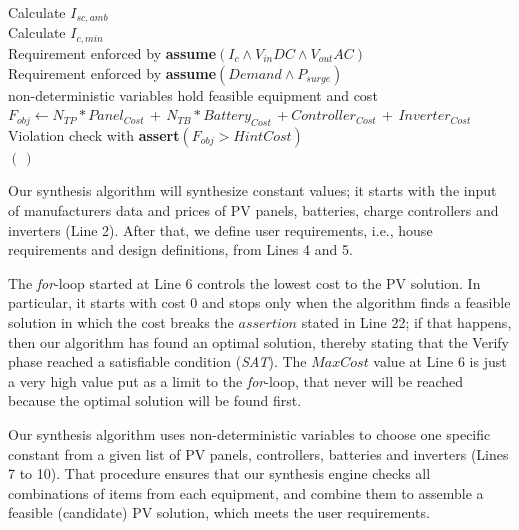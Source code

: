 \documentclass[runningheads]{llncs}
\begin{document}
\begin{algorithm}
\begin{algorithmic}[1]
\begin{scriptsize}
 	\STATE Calculate $I_{sc,amb}$ \\
 	\STATE Calculate $I_{c,min}$ \\
 	\STATE Requirement enforced by \textbf{assume}$(I_{c} \wedge V_{in}DC \wedge V_{out}AC)$ \\
	\STATE Requirement enforced by \textbf{assume}$(Demand \wedge P_{surge})$ \\
	\STATE non-deterministic variables hold feasible equipment and cost  \\
	\STATE $F_{obj} \leftarrow  N_{TP}*Panel_{Cost} \, + \, N_{TB}*Battery_{Cost} \, + Controller_{Cost} \, + \, Inverter_{Cost}$ \\
	\STATE Violation check with \textbf{assert}$(F_{obj} > HintCost)$ \\
  \ENDFOR
 \RETURN $(\,)$ 
  \end{scriptsize}
 \end{algorithmic} 
 \label{alg:verification-algorithm}
 \end{algorithm}
%

Our synthesis algorithm will synthesize constant values; it starts with the input of manufacturers data and prices of PV panels, batteries, charge controllers and inverters (Line 2). After that, we define user requirements, i.e., house requirements and design definitions, from Lines 4 and 5. 

The \textit{for}-loop started at Line 6 controls the lowest cost to the PV solution. In particular, it starts with cost $0$ and stops only when the algorithm finds a feasible solution in which the cost breaks the $assertion$ stated in Line 22; if that happens, then our algorithm has found an optimal solution, thereby stating that the {\sc Verify} phase reached a satisfiable condition (\textit{SAT}). The $MaxCost$ value at Line 6 is just a very high value put as a limit to the \textit{for}-loop, that never will be reached because the optimal solution will be found first.

Our synthesis algorithm uses non-deterministic variables to choose one specific constant from a given list of PV panels, controllers, batteries and inverters (Lines 7 to 10). That procedure ensures that our synthesis engine checks all combinations of items from each equipment, and combine them to assemble a feasible (candidate) PV solution, which meets the user requirements.
\end{document}

